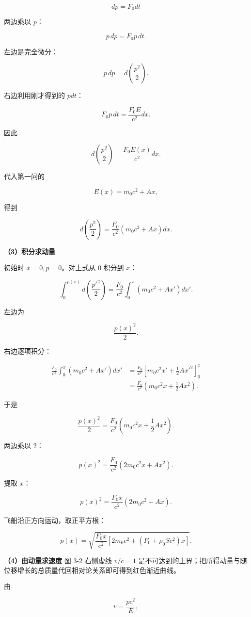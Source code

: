 \documentclass[12pt,a4paper,UTF8]{ctexart}
\begin{document}
\[dp=F_0dt\]

两边乘以 \(p\)：

\[p\,dp=F_0p\,dt.\]

左边是完全微分：

\[p\,dp=d\left(\frac{p^2}{2}\right).\]

右边利用刚才得到的 \(pdt\)：

\[F_0p\,dt=\frac{F_0E}{c^2}dx.\]

因此

\[d\left(\frac{p^2}{2}\right)
=\frac{F_0E(x)}{c^2}dx.\]

代入第一问的

\[E(x)=m_0c^2+Ax,\]

得到

\[d\left(\frac{p^2}{2}\right)
=\frac{F_0}{c^2}
\left(m_0c^2+Ax\right)dx.\]

\textbf{（3）积分求动量}

初始时 \(x=0,p=0\)。对上式从 \(0\) 积分到 \(x\)：

\[\int_0^{p(x)}
d\left(\frac{p'^2}{2}\right)
=\frac{F_0}{c^2}
\int_0^x\left(m_0c^2+Ax'\right)dx'.\]

左边为

\[\frac{p(x)^2}{2}.\]

右边逐项积分：

\[\begin{aligned}
\frac{F_0}{c^2}
\int_0^x\left(m_0c^2+Ax'\right)dx'
&=\frac{F_0}{c^2}
\left[
m_0c^2x'+\frac12Ax'^2
\right]_0^x\\
&=\frac{F_0}{c^2}
\left(m_0c^2x+\frac12Ax^2\right).
\end{aligned}\]

于是

\[\frac{p(x)^2}{2}
=\frac{F_0}{c^2}
\left(m_0c^2x+\frac12Ax^2\right).\]

两边乘以 \(2\)：

\[p(x)^2
=\frac{F_0}{c^2}
\left(2m_0c^2x+Ax^2\right).\]

提取 \(x\)：

\[p(x)^2
=\frac{F_0x}{c^2}
\left(2m_0c^2+Ax\right).\]

飞船沿正方向运动，取正平方根：

\[\boxed{
p(x)=
\sqrt{
\frac{F_0x}{c^2}
\left[
2m_0c^2+\left(F_0+\rho_0Sc^2\right)x
\right]
}
}.\]

\textbf{（4）由动量求速度} 图 3-2 右侧虚线 \(v/c=1\)
是不可达到的上界；把所得动量与随位移增长的总质量代回相对论关系即可得到红色渐近曲线。

由

\[v=\frac{pc^2}{E},\]
\end{document}
